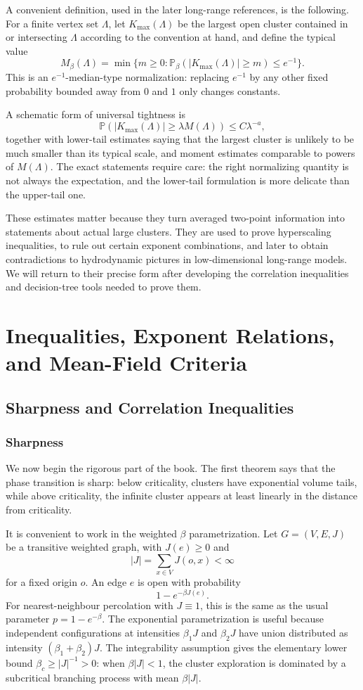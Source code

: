 \documentclass[11pt,reqno]{book}
\numberwithin{equation}{chapter}
\theoremstyle{plain}
\theoremstyle{definition}
\theoremstyle{remark}
\newcommand{\Pb}{\mathbb P_\beta}
\renewcommand{\P}{\mathbb P}
\newcommand{\1}{\mathbf 1}
\begin{document}
A convenient definition, used in the later long-range references, is the following. For a finite vertex set $\Lambda$, let $K_{\max}(\Lambda)$ be the largest open cluster contained in or intersecting $\Lambda$ according to the convention at hand, and define the typical value
\[
  M_\beta(\Lambda)
  =
  \min\{m\geq 0:\Pb(|K_{\max}(\Lambda)|\geq m)\leq e^{-1}\}.
\]
This is an $e^{-1}$-median-type normalization: replacing $e^{-1}$ by any other fixed probability bounded away from $0$ and $1$ only changes constants.

A schematic form of universal tightness is
\[
  \P(|K_{\max}(\Lambda)|\geq \lambda M(\Lambda))\leq C\lambda^{-a},
\]
together with lower-tail estimates saying that the largest cluster is unlikely to be much smaller than its typical scale, and moment estimates comparable to powers of $M(\Lambda)$. The exact statements require care: the right normalizing quantity is not always the expectation, and the lower-tail formulation is more delicate than the upper-tail one.

These estimates matter because they turn averaged two-point information into statements about actual large clusters. They are used to prove hyperscaling inequalities, to rule out certain exponent combinations, and later to obtain contradictions to hydrodynamic pictures in low-dimensional long-range models. We will return to their precise form after developing the correlation inequalities and decision-tree tools needed to prove them.

\part{Inequalities, Exponent Relations, and Mean-Field Criteria}

\chapter{Sharpness and Correlation Inequalities}

\section{Sharpness}

We now begin the rigorous part of the book. The first theorem says that the phase transition is sharp: below criticality, clusters have exponential volume tails, while above criticality, the infinite cluster appears at least linearly in the distance from criticality.

It is convenient to work in the weighted $\beta$ parametrization. Let $G=(V,E,J)$ be a transitive weighted graph, with $J(e)\geq 0$ and
\[
  |J|=\sum_{x\in V}J(o,x)<\infty
\]
for a fixed origin $o$. An edge $e$ is open with probability
\[
  1-e^{-\beta J(e)}.
\]
For nearest-neighbour percolation with $J\equiv 1$, this is the same as the usual parameter $p=1-e^{-\beta}$. The exponential parametrization is useful because independent configurations at intensities $\beta_1J$ and $\beta_2J$ have union distributed as intensity $(\beta_1+\beta_2)J$. The integrability assumption gives the elementary lower bound $\beta_c\geq |J|^{-1}>0$: when $\beta |J|<1$, the cluster exploration is dominated by a subcritical branching process with mean $\beta |J|$.
\end{document}
